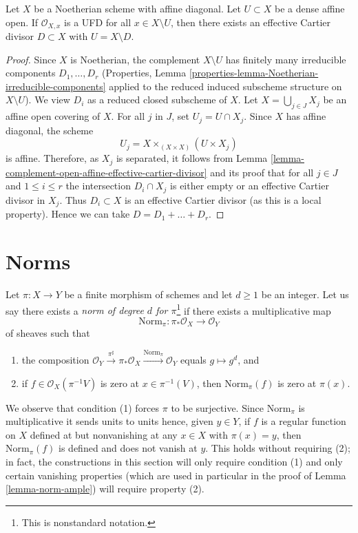 \begin{lemma}
\label{lemma-complement-open-affine-effective-cartier-divisor-bis}
Let $X$ be a Noetherian scheme with affine diagonal. Let $U \subset X$ be
a dense affine open. If $\mathcal{O}_{X, x}$ is a UFD for all
$x \in X \setminus U$, then there exists an effective Cartier
divisor $D \subset X$ with $U = X \setminus D$.
\end{lemma}

\begin{proof}
Since $X$ is Noetherian, the complement $X \setminus U$ has finitely
many irreducible components $D_1, \ldots, D_r$
(Properties, Lemma \ref{properties-lemma-Noetherian-irreducible-components}
applied to the reduced induced subscheme structure on $X \setminus U$).
We view $D_i$ as a reduced closed subscheme of $X$.
Let $X = \bigcup_{j \in J} X_j$ be an affine open covering of $X$. For all
$j$ in $J$, set $U_j = U \cap X_j$. Since $X$ has affine diagonal,
the scheme
$$
U_j = X \times_{(X \times X)} (U \times X_j)
$$
is affine. Therefore, as $X_j$ is separated, it follows from
Lemma \ref{lemma-complement-open-affine-effective-cartier-divisor}
and its proof that for all $j \in J$ and $1 \leq i \leq r$ the
intersection $D_i \cap X_j$ is either empty or an
effective Cartier divisor in $X_j$.
Thus $D_i \subset X$ is an effective Cartier divisor (as this is
a local property). Hence we can take $D = D_1 + \ldots + D_r$.
\end{proof}




\section{Norms}
\label{section-norms}

\noindent
Let $\pi : X \to Y$ be a finite morphism of schemes and let $d \geq 1$
be an integer. Let us say there exists a
{\it norm of degree $d$ for $\pi$}\footnote{This is nonstandard
notation.} if there exists a multiplicative map
$$
\text{Norm}_\pi : \pi_*\mathcal{O}_X \to \mathcal{O}_Y
$$
of sheaves such that
\begin{enumerate}
\item the composition
$\mathcal{O}_Y \xrightarrow{\pi^\sharp} \pi_*\mathcal{O}_X
\xrightarrow{\text{Norm}_\pi} \mathcal{O}_Y$ equals $g \mapsto g^d$, and
\item if $f \in \mathcal{O}_X(\pi^{-1}V)$
is zero at $x \in \pi^{-1}(V)$, then $\text{Norm}_\pi(f)$
is zero at $\pi(x)$.
\end{enumerate}
We observe that condition (1) forces $\pi$ to be surjective.
Since $\text{Norm}_\pi$ is multiplicative it sends units to units
hence, given $y \in Y$, if $f$ is a regular function on $X$
defined at but nonvanishing at any $x \in X$
with $\pi(x) = y$, then $\text{Norm}_\pi(f)$ is defined
and does not vanish at $y$. This holds without requiring (2);
in fact, the constructions in this section will only require condition (1)
and only certain vanishing properties (which are used in particular
in the proof of Lemma \ref{lemma-norm-ample}) will require property (2).

